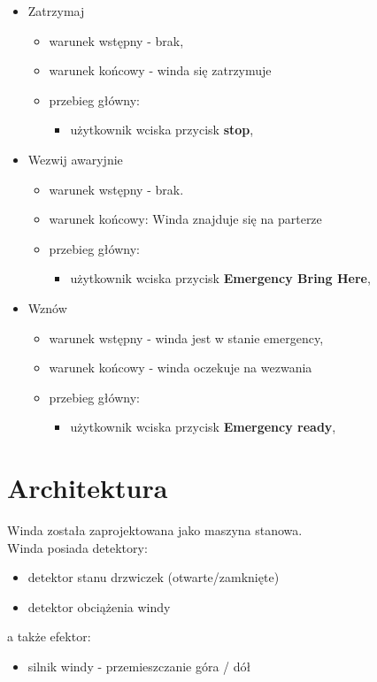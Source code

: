 \documentclass[a4paper,11pt]{article}
\begin{document}
\begin{itemize}
\item Zatrzymaj 
\begin{itemize}
\item warunek wstępny - brak,
\item warunek końcowy - winda się zatrzymuje
\item przebieg główny:
\begin{itemize}
\item użytkownik wciska przycisk \textbf{stop},
\end{itemize}
\end{itemize}
\item Wezwij awaryjnie
\begin{itemize}
\item warunek wstępny - brak.
\item warunek końcowy: Winda znajduje się na parterze
\item przebieg główny:
\begin{itemize} 
\item użytkownik wciska przycisk \textbf{Emergency Bring Here},
\end{itemize}
\end{itemize}
\item Wznów
\begin{itemize}
\item warunek wstępny - winda jest w stanie emergency,
\item warunek końcowy - winda oczekuje na wezwania
\item przebieg główny:
\begin{itemize}
\item użytkownik wciska przycisk \textbf{Emergency ready},
\end{itemize}
\end{itemize}
\end{itemize}
\section{Architektura}
Winda została zaprojektowana jako maszyna stanowa. \\ 
Winda posiada detektory:
\begin{itemize}
\item detektor stanu drzwiczek (otwarte/zamknięte)
\item detektor obciążenia windy
\end{itemize}
a także efektor:
\begin{itemize}
\item silnik windy - przemieszczanie góra / dół
\end{itemize}
\end{document}
